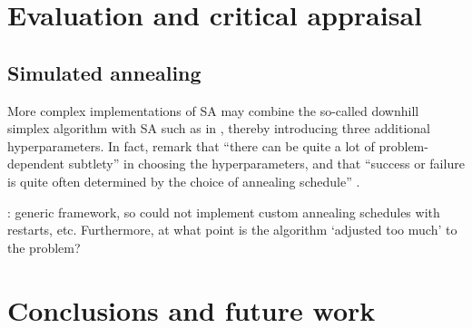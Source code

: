 \chapter{Evaluation and critical appraisal}

\section{Simulated annealing}
\label{sec:eval_sim_annealing}
More complex implementations of SA may combine the so-called downhill simplex algorithm \cite{nelder1965} with SA such as in \textcite[p. 444-455]{press1992}, thereby introducing three additional hyperparameters.
In fact, \citeauthor{press1992} remark that ``there can be quite a lot of problem-dependent subtlety'' in choosing the hyperparameters, and that ``success or failure is quite often determined by the choice of annealing schedule'' \cite*[p. 452]{press1992}.

\todo: generic framework, so could not implement custom annealing schedules with restarts, etc.
Furthermore, at what point is the algorithm `adjusted too much' to the problem?

\chapter{Conclusions and future work}